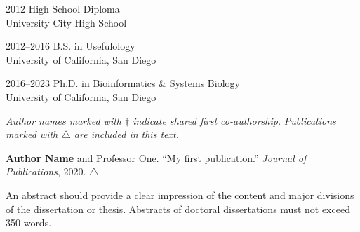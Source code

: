 \documentclass[11pt]{formatting-template}
\begin{document}
\begin{vita}
\noindent
\begin{cv}{}
\begin{cvlist}{}
	\item[2012] High School Diploma\\
		University City High School
	\item[2012--2016] B.S. in Usefulology\\
		University of California, San Diego
	\item[2016--2023] Ph.D. in Bioinformatics \& Systems Biology\\
		University of California, San Diego
\end{cvlist}
\end{cv}

\publications{}

\noindent \textit{Author names marked with $\dagger$ indicate shared first co-authorship.} \newline
\noindent \textit{Publications marked with $\triangle$ are included in this text.} \newline

\noindent \textbf{Author Name} and Professor One. ``My first publication.'' \textit{Journal of Publications}, 2020. $\triangle$ \newline


\end{vita}

\begin{dissertationabstract}
	An abstract should provide a clear impression of the content and major divisions of the dissertation or thesis. Abstracts of doctoral dissertations must not exceed 350 words. 
\end{dissertationabstract}

\mainmatter{}







\appendix





\backmatter{}
 

\end{document}
